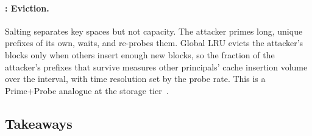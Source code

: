 \paragraph{: Eviction.} Salting separates key spaces but not capacity. The
attacker primes long, unique prefixes of its own, waits, and re-probes them.
Global LRU evicts the attacker's blocks only when others insert enough new
blocks, so the fraction of the attacker's prefixes that survive measures
other principals' cache insertion volume over the interval, with time
resolution set by the probe rate. This is a Prime+Probe analogue at the
storage tier~\cite{yarom2014flush}. 

\subsection{Takeaways}
